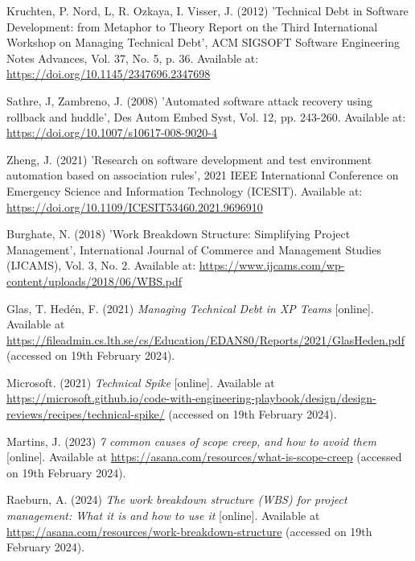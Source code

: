 \noindent Kruchten, P. Nord, L, R. Ozkaya, I. Visser, J. (2012) 'Technical Debt in Software Development: from Metaphor to Theory Report on the Third International Workshop on Managing Technical Debt', ACM SIGSOFT Software Engineering Notes Advances, Vol. 37, No. 5, p. 36. Available at: \url{https://doi.org/10.1145/2347696.2347698}
\vspace{0.2cm}

\noindent Sathre, J, Zambreno, J. (2008) 'Automated software attack recovery using rollback and huddle', Des Autom Embed Syst, Vol. 12, pp. 243-260. Available at: \url{https://doi.org/10.1007/s10617-008-9020-4}
\vspace{0.2cm}

\noindent Zheng, J. (2021) 'Research on software development and test environment automation based on association rules', 2021 IEEE International Conference on Emergency Science and Information Technology (ICESIT). Available at: \url{https://doi.org/10.1109/ICESIT53460.2021.9696910}
\vspace{0.2cm}

\noindent Burghate, N. (2018) 'Work Breakdown Structure: Simplifying Project Management', International Journal of Commerce and Management Studies (IJCAMS), Vol. 3, No. 2. Available at: \url{https://www.ijcams.com/wp-content/uploads/2018/06/WBS.pdf}
\vspace{0.2cm}

\noindent Glas, T. Hedén, F. (2021) \textit{Managing Technical Debt in XP Teams} [online]. Available at \url{https://fileadmin.cs.lth.se/cs/Education/EDAN80/Reports/2021/GlasHeden.pdf} (accessed on 19th February 2024).
\vspace{0.2cm}

\noindent Microsoft. (2021) \textit{Technical Spike} [online]. Available at \url{https://microsoft.github.io/code-with-engineering-playbook/design/design-reviews/recipes/technical-spike/} (accessed on 19th February 2024).
\vspace{0.2cm}

\noindent Martins, J. (2023) \textit{7 common causes of scope creep, and how to avoid them} [online]. Available at \url{https://asana.com/resources/what-is-scope-creep} (accessed on 19th February 2024).
\vspace{0.2cm}

\noindent Raeburn, A. (2024) \textit{The work breakdown structure (WBS) for project management: What it is and how to use it} [online]. Available at \url{https://asana.com/resources/work-breakdown-structure} (accessed on 19th February 2024).
\vspace{0.2cm}

